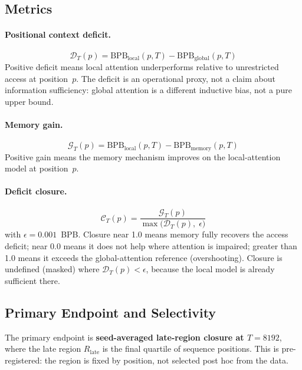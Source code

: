 \documentclass[11pt]{article}
\newcommand{\bpb}{\mathrm{BPB}}
\newcommand{\deficit}{\mathcal{D}}
\newcommand{\gain}{\mathcal{G}}
\newcommand{\closure}{\mathcal{C}}
\begin{document}
\subsection{Metrics}

\paragraph{Positional context deficit.}
\begin{equation}
  \deficit_T(p) = \bpb_{\text{local}}(p, T) - \bpb_{\text{global}}(p, T)
  \label{eq:deficit}
\end{equation}
Positive deficit means local attention underperforms relative to
unrestricted access at position~$p$. The deficit is an operational proxy,
not a claim about information sufficiency: global attention is a different
inductive bias, not a pure upper bound.

\paragraph{Memory gain.}
\begin{equation}
  \gain_T(p) = \bpb_{\text{local}}(p, T) - \bpb_{\text{memory}}(p, T)
  \label{eq:gain}
\end{equation}
Positive gain means the memory mechanism improves on the local-attention
model at position~$p$.

\paragraph{Deficit closure.}
\begin{equation}
  \closure_T(p) = \frac{\gain_T(p)}{\max\bigl(\deficit_T(p),\; \epsilon\bigr)}
  \label{eq:closure}
\end{equation}
with $\epsilon = 0.001$~BPB. Closure near 1.0 means memory fully
recovers the access deficit; near 0.0 means it does not help where
attention is impaired; greater than 1.0 means it exceeds the
global-attention reference (overshooting). Closure is undefined
(masked) where $\deficit_T(p) < \epsilon$, because the local model
is already sufficient there.

\subsection{Primary Endpoint and Selectivity}
\label{sec:primary}

The primary endpoint is \textbf{seed-averaged late-region closure
at $T{=}8192$}, where the late region $R_{\text{late}}$ is the
final quartile of sequence positions. This is pre-registered: the
region is fixed by position, not selected post hoc from the data.
\end{document}
